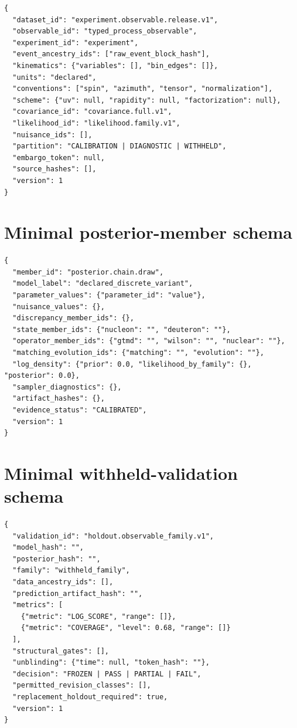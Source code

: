 \documentclass[11pt]{article}
\begin{document}
\begin{verbatim}
{
  "dataset_id": "experiment.observable.release.v1",
  "observable_id": "typed_process_observable",
  "experiment_id": "experiment",
  "event_ancestry_ids": ["raw_event_block_hash"],
  "kinematics": {"variables": [], "bin_edges": []},
  "units": "declared",
  "conventions": ["spin", "azimuth", "tensor", "normalization"],
  "scheme": {"uv": null, "rapidity": null, "factorization": null},
  "covariance_id": "covariance.full.v1",
  "likelihood_id": "likelihood.family.v1",
  "nuisance_ids": [],
  "partition": "CALIBRATION | DIAGNOSTIC | WITHHELD",
  "embargo_token": null,
  "source_hashes": [],
  "version": 1
}
\end{verbatim}

\section{Minimal posterior-member schema}
\label{app:member-schema}

\begin{verbatim}
{
  "member_id": "posterior.chain.draw",
  "model_label": "declared_discrete_variant",
  "parameter_values": {"parameter_id": "value"},
  "nuisance_values": {},
  "discrepancy_member_ids": {},
  "state_member_ids": {"nucleon": "", "deuteron": ""},
  "operator_member_ids": {"gtmd": "", "wilson": "", "nuclear": ""},
  "matching_evolution_ids": {"matching": "", "evolution": ""},
  "log_density": {"prior": 0.0, "likelihood_by_family": {}, "posterior": 0.0},
  "sampler_diagnostics": {},
  "artifact_hashes": {},
  "evidence_status": "CALIBRATED",
  "version": 1
}
\end{verbatim}

\section{Minimal withheld-validation schema}
\label{app:validation-schema}

\begin{verbatim}
{
  "validation_id": "holdout.observable_family.v1",
  "model_hash": "",
  "posterior_hash": "",
  "family": "withheld_family",
  "data_ancestry_ids": [],
  "prediction_artifact_hash": "",
  "metrics": [
    {"metric": "LOG_SCORE", "range": []},
    {"metric": "COVERAGE", "level": 0.68, "range": []}
  ],
  "structural_gates": [],
  "unblinding": {"time": null, "token_hash": ""},
  "decision": "FROZEN | PASS | PARTIAL | FAIL",
  "permitted_revision_classes": [],
  "replacement_holdout_required": true,
  "version": 1
}
\end{verbatim}
\end{document}
